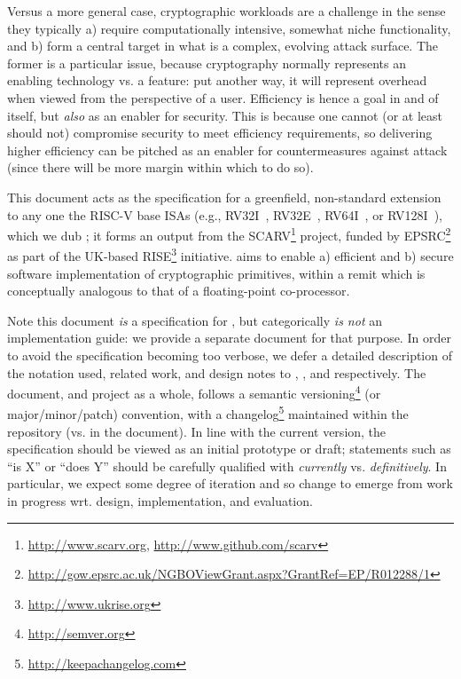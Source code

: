 
Versus a more general case, cryptographic workloads are a challenge in the
sense they typically
a) require computationally intensive, somewhat niche functionality,
   and
b) form a central target in what is a complex, evolving attack surface.
The former is a particular issue, because cryptography normally represents
an enabling technology vs. a feature: put another way, it will represent
overhead when viewed from the perspective of a user.  Efficiency is hence 
a goal in and of itself, but {\em also} as an enabler for security.  This 
is because one cannot (or at least should not) compromise security to meet 
efficiency requirements, so delivering higher efficiency can be pitched as 
an enabler for countermeasures against attack (since there will be more 
margin within which to do so).

This document acts as the specification for a 
greenfield, non-standard extension~\cite[Section 21.1]{SCARV:RV:ISA:I:17} 
to any one the RISC-V base ISAs
(e.g., RV32I~\cite[Section 2]{SCARV:RV:ISA:I:17}, RV32E~\cite[Section 3]{SCARV:RV:ISA:I:17}, RV64I~\cite[Section 4]{SCARV:RV:ISA:I:17}, or RV128I~\cite[Section 5]{SCARV:RV:ISA:I:17}),
which we dub \XCID; it forms an output from the SCARV\footnote{
\url{http://www.scarv.org}, \url{http://www.github.com/scarv}
} project, funded by EPSRC\footnote{
\url{http://gow.epsrc.ac.uk/NGBOViewGrant.aspx?GrantRef=EP/R012288/1}
} as part of the UK-based RISE\footnote{
\url{http://www.ukrise.org}
} initiative.  
\XCID aims to enable
a) efficient
   and
b) secure
software implementation of cryptographic primitives, within a remit which
is conceptually analogous to that of a floating-point co-processor.

Note this document {\em is} a specification for \XCID, but categorically
{\em is not} an implementation guide: we provide a separate document for 
that purpose.  In order to avoid the specification becoming too verbose,
we defer a detailed description of the notation used, related work, and 
design notes to
,
,
and
respectively.  The document, and project as a whole, follows a semantic 
versioning\footnote{
\url{http://semver.org}
} (or major/minor/patch) convention, with a changelog\footnote{
\url{http://keepachangelog.com}
} maintained within the repository (vs. in the document).
In line with the current version, the specification should be viewed as an
initial prototype or draft; statements such as 
``\XCID is   X'' 
or
``\XCID does Y''
should be carefully qualified with {\em currently} vs. {\em definitively}.  
In particular, we expect some degree of iteration and so change to emerge 
from work in progress wrt. design, implementation, and evaluation.

